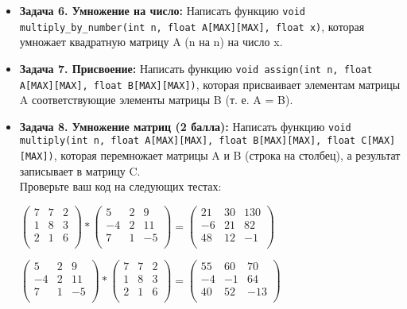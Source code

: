 \documentclass{article}
\begin{document}
\begin{itemize}
\item \textbf{Задача 6. Умножение на число:} Написать функцию \texttt{void multiply\_by\_number(int n, float A[MAX][MAX], float x)}, которая умножает квадратную матрицу A (n на n) на число x.
\item \textbf{Задача 7. Присвоение:} Написать функцию \texttt{void assign(int n, float A[MAX][MAX], float B[MAX][MAX])}, которая присваивает элементам матрицы A соответствующие элементы матрицы B (т. е. A = B).
\item \textbf{Задача 8. Умножение матриц (2 балла):} Написать функцию \texttt{void multiply(int n, float A[MAX][MAX], float B[MAX][MAX], float C[MAX][MAX])}, которая перемножает матрицы A и B (строка на столбец), а результат записывает в матрицу C. \\
Проверьте ваш код на следующих тестах:

\begin{center}
$\begin{pmatrix}
7 & 7 & 2 \\
1 & 8 & 3 \\
2 & 1 & 6 \\
\end{pmatrix} * 
\begin{pmatrix}
5 & 2 & 9 \\
-4 & 2 & 11 \\
7 & 1 & -5 \\
\end{pmatrix}=
\begin{pmatrix}
21 & 30 & 130 \\
-6 & 21 & 82 \\
48 & 12 & -1 \\
\end{pmatrix}
$
\end{center}

\begin{center}

$
\begin{pmatrix}
5 & 2 & 9 \\
-4 & 2 & 11 \\
7 & 1 & -5 \\
\end{pmatrix} *
\begin{pmatrix}
7 & 7 & 2 \\
1 & 8 & 3 \\
2 & 1 & 6 \\
\end{pmatrix}
=
\begin{pmatrix}
55 & 60 & 70 \\
-4 & -1 & 64 \\
40 & 52 & -13 \\
\end{pmatrix}
$
\end{center}


\end{itemize}
\end{document}
